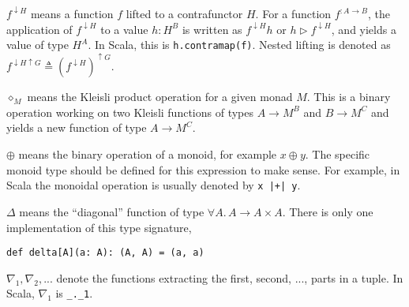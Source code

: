 $f^{\downarrow H}$ means a function $f$ lifted to a contrafunctor
$H$. For a function $f^{:A\rightarrow B}$, the application of $f^{\downarrow H}$
to a value $h:H^{B}$ is written as $f^{\downarrow H}h$ or $h\triangleright f^{\downarrow H}$,
and yields a value of type $H^{A}$. In Scala, this is \lstinline!h.contramap(f)!.
Nested lifting is denoted as $f^{\downarrow H\uparrow G}\triangleq(f^{\downarrow H})^{\uparrow G}$.

$\diamond_{M}$ means the Kleisli product operation for a given monad
$M$. This is a binary operation working on two Kleisli functions
of types $A\rightarrow M^{B}$ and $B\rightarrow M^{C}$ and yields
a new function of type $A\rightarrow M^{C}$.

$\oplus$ means the binary operation of a monoid, for example $x\oplus y$.
The specific monoid type should be defined for this expression to
make sense. For example, in Scala the monoidal operation is usually
denoted by \lstinline!x |+| y!.

$\Delta$ means the ``diagonal'' function of type $\forall A.\,A\rightarrow A\times A$.
There is only one implementation of this type signature,
\begin{lstlisting}
def delta[A](a: A): (A, A) = (a, a)
\end{lstlisting}

$\nabla_{1},\nabla_{2},...$ denote the functions extracting the first,
second, ..., parts in a tuple. In Scala, $\nabla_{1}$ is \lstinline!_._1!.

